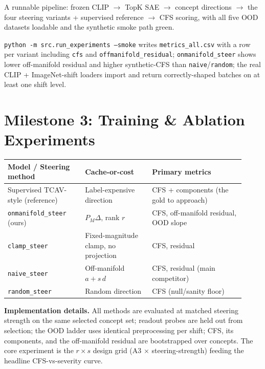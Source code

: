 \documentclass[11pt]{article}
\begin{document}
\begin{delivbox}
A runnable pipeline: frozen CLIP $\to$ TopK SAE $\to$ concept directions $\to$ the four
steering variants + supervised reference $\to$ CFS scoring, with all five OOD datasets
loadable and the synthetic smoke path green.
\end{delivbox}
\begin{checkbox}
\texttt{python -m src.run\_experiments --smoke} writes \texttt{metrics\_all.csv} with a
row per variant including \texttt{cfs} and \texttt{offmanifold\_residual};
\texttt{onmanifold\_steer} shows lower off-manifold residual and higher synthetic-CFS
than \texttt{naive}/\texttt{random}; the real CLIP + ImageNet-shift loaders import and
return correctly-shaped batches on at least one shift level.
\end{checkbox}

\section{Milestone 3: Training \& Ablation Experiments}

\renewcommand{\arraystretch}{1.2}
\begin{center}\small
\begin{tabular}{@{}p{0.30\linewidth} p{0.26\linewidth} p{0.36\linewidth}@{}}
\toprule
\textbf{Model / Steering method} & \textbf{Cache-or-cost} & \textbf{Primary metrics}\\
\midrule
Supervised TCAV-style (reference) & Label-expensive direction & CFS + components
  (the gold to approach)\\
\texttt{onmanifold\_steer} (ours) & $P_M\Delta$, rank $r$ & CFS, off-manifold residual,
  OOD slope\\
\texttt{clamp\_steer} & Fixed-magnitude clamp, no projection & CFS, residual\\
\texttt{naive\_steer} & Off-manifold $a+s\,d$ & CFS, residual (main competitor)\\
\texttt{random\_steer} & Random direction & CFS (null/sanity floor)\\
\bottomrule
\end{tabular}
\end{center}

\textbf{Implementation details.} All methods are evaluated at matched steering strength
on the same selected concept set; readout probes are held out from selection; the OOD
ladder uses identical preprocessing per shift; CFS, its components, and the off-manifold
residual are bootstrapped over concepts. The core experiment is the $r\times s$ design
grid (A3 $\times$ steering-strength) feeding the headline CFS-vs-severity curve.
\end{document}
